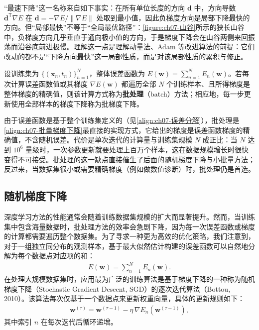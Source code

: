 \documentclass[../../main.tex]{subfiles}
\begin{document}
\begin{remark}
“最速下降”这一名称来自如下事实：在所有单位长度的方向 $\mathbf{d}$ 中，方向导数 $\mathbf{d}^{\mathsf T}\nabla E$ 在 $\mathbf{d}=-\nabla E/\|\nabla E\|$ 处取到最小值，因此负梯度方向是局部下降最快的方向。但“局部最快”不等于“全局最优路径”：\cref{figure:ch07-山谷}所示的狭长山谷中，负梯度方向几乎垂直于通向极小值的方向，于是梯度下降会在山谷两侧来回振荡而沿谷底前进极慢。理解这一点是理解动量法、Adam 等改进算法的前提：它们改动的都不是“下降方向最快”这一局部性质，而是对该局部性质的累积与修正。
\end{remark}

\begin{definition}[批处理方法]\label{definition:ch07-批处理}
设训练集为 $\{(\mathbf{x}_{n},t_{n})\}_{n=1}^{N}$，整体误差函数为 $E(\mathbf{w})=\sum_{n=1}^{N}E_{n}(\mathbf{w})$。若每次计算误差函数值或其梯度 $\nabla E(\mathbf{w})$ 都遍历全部 $N$ 个训练样本、且所得梯度是整体梯度的精确值，则该计算方式称为\textbf{批处理}（batch）方法；相应地，每一步更新使用全部样本的梯度下降称为批梯度下降。
\end{definition}

\begin{remark}
由于误差函数是基于整个训练集定义的（见\eqref{align:ch07-误差分解}），批处理是\eqref{align:ch07-批量梯度下降}最直接的实现方式，它给出的梯度是误差函数梯度的精确值，不含随机误差。代价是单次迭代的计算量与训练集规模 $N$ 成正比：当 $N$ 达到 $10^{6}$ 量级时，一次参数更新就要处理上百万个样本，这在数据规模增长时很快变得不可接受。批处理的这一缺点直接催生了后面的随机梯度下降与小批量方法；反过来，当数据集很小或需要精确梯度（例如做数值诊断）时，批处理仍是首选。
\end{remark}

\subsection{随机梯度下降}\label{subsection:ch07-随机梯度下降}

深度学习方法的性能通常会随着训练数据集规模的扩大而显著提升。然而，当训练集中包含海量数据时，批处理方法的效率会急剧下降，因为每一次误差函数或梯度的计算都需要遍历整个数据集。为了寻求一种更为高效的优化策略，我们注意到，对于一组独立同分布的观测样本，基于最大似然估计构建的误差函数可以自然地分解为每个数据点对应项的和：
\begin{align}
E(\mathbf{w}) = \sum_{n=1}^{N}E_n(\mathbf{w}).
\label{align:ch07-误差分解}
\end{align}
在处理大规模数据集时，应用最为广泛的训练算法是基于梯度下降的一种称为随机梯度下降（Stochastic Gradient Descent, SGD）的逐次迭代算法（Bottou, 2010）。该算法每次仅基于一个数据点来更新权重向量，具体的更新规则如下：
\begin{align}
\mathbf{w}^{(\tau)} = \mathbf{w}^{(\tau-1)}-\eta\,\nabla E_n(\mathbf{w}^{(\tau-1)}),
\label{align:ch07-随机梯度下降}
\end{align}
其中索引 $n$ 在每次迭代后循环递增。
\end{document}
